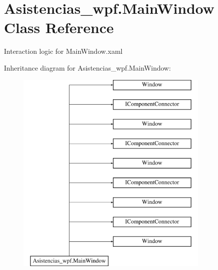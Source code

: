 \hypertarget{class_asistencias__wpf_1_1_main_window}{\section{Asistencias\-\_\-wpf.\-Main\-Window Class Reference}
\label{class_asistencias__wpf_1_1_main_window}
}


Interaction logic for Main\-Window.\-xaml  


Inheritance diagram for Asistencias\-\_\-wpf.\-Main\-Window\-:\begin{figure}[H]
\begin{center}
\leavevmode
\includegraphics[height=10.000000cm]{d6/d1a/class_asistencias__wpf_1_1_main_window}
\end{center}
\end{figure}
